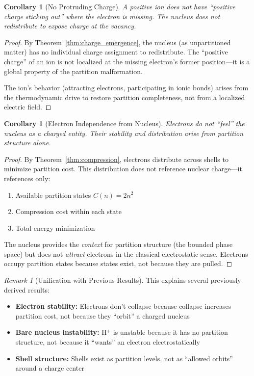 \documentclass[twocolumn,10pt,a4paper]{article}
\newtheorem{corollary}[theorem]{Corollary}
\theoremstyle{definition}
\theoremstyle{remark}
\newtheorem{remark}[theorem]{Remark}
\begin{document}
\begin{corollary}[No Protruding Charge]
\label{cor:no_protrusion}
A positive ion does not have ``positive charge sticking out'' where the electron is missing. The nucleus does not redistribute to expose charge at the vacancy.
\end{corollary}

\begin{proof}
By Theorem~\ref{thm:charge_emergence}, the nucleus (as unpartitioned matter) has no individual charge assignment to redistribute. The ``positive charge'' of an ion is not localized at the missing electron's former position---it is a global property of the partition malformation.

The ion's behavior (attracting electrons, participating in ionic bonds) arises from the thermodynamic drive to restore partition completeness, not from a localized electric field.
\end{proof}

\begin{corollary}[Electron Independence from Nucleus]
\label{cor:electron_independence}
Electrons do not ``feel'' the nucleus as a charged entity. Their stability and distribution arise from partition structure alone.
\end{corollary}

\begin{proof}
By Theorem~\ref{thm:compression}, electrons distribute across shells to minimize partition cost. This distribution does not reference nuclear charge---it references only:
\begin{enumerate}
    \item Available partition states $C(n) = 2n^2$
    \item Compression cost within each state
    \item Total energy minimization
\end{enumerate}

The nucleus provides the \emph{context} for partition structure (the bounded phase space) but does not \emph{attract} electrons in the classical electrostatic sense. Electrons occupy partition states because states exist, not because they are pulled.
\end{proof}

\begin{remark}[Unification with Previous Results]
This explains several previously derived results:
\begin{itemize}
    \item \textbf{Electron stability:} Electrons don't collapse because collapse increases partition cost, not because they ``orbit'' a charged nucleus
    \item \textbf{Bare nucleus instability:} H$^+$ is unstable because it has no partition structure, not because it ``wants'' an electron electrostatically
    \item \textbf{Shell structure:} Shells exist as partition levels, not as ``allowed orbits'' around a charge center
\end{itemize}
\end{remark}
\end{document}
